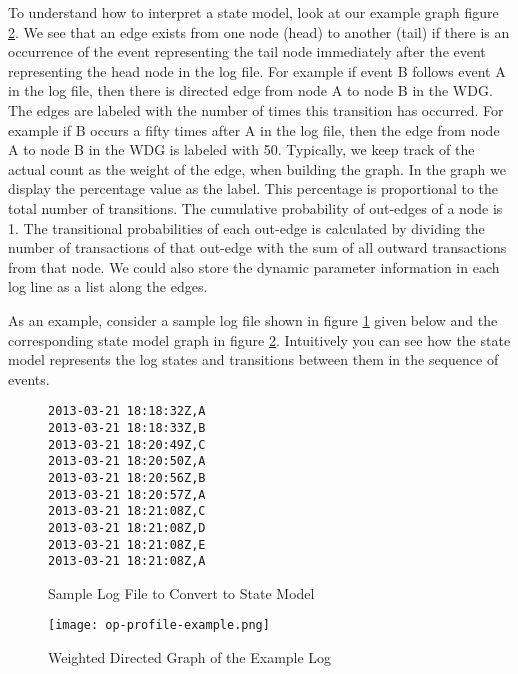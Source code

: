 To understand how to interpret a state model, look at our example graph figure \ref{op-profile-example}.  We see that an edge exists from one node (head) to another (tail) if there is an occurrence of the event representing the tail node immediately after the event representing the head node in the  log file. For example if event B follows event A in the log file, then there is directed edge from node A to node B in the WDG. The edges are labeled with the number of times this transition has occurred.  For example if B occurs a fifty times after A in the log file, then the edge from node A to node B in the WDG is labeled with 50. Typically, we keep track of the actual count as the weight of the edge, when building the graph. In the graph we display the percentage value as the label. This percentage is proportional to the total number of transitions.  The cumulative probability of out-edges of a node is 1. The transitional probabilities of each out-edge is calculated by dividing the number of transactions of that out-edge with the sum of all outward transactions from that node. We could also store the dynamic parameter information in each log line as a list along the edges. 

As an example, consider a sample log file shown in figure \ref{samplelogfile} given below and the corresponding state model graph in figure \ref{op-profile-example}. Intuitively you can see how the state model represents the log states and transitions between them in the sequence of events.  

\begin{figure}
\hrulefill
\begin{verbatim}
2013-03-21 18:18:32Z,A
2013-03-21 18:18:33Z,B
2013-03-21 18:20:49Z,C
2013-03-21 18:20:50Z,A
2013-03-21 18:20:56Z,B
2013-03-21 18:20:57Z,A
2013-03-21 18:21:08Z,C
2013-03-21 18:21:08Z,D
2013-03-21 18:21:08Z,E
2013-03-21 18:21:08Z,A
\end{verbatim}
\hrulefill
\caption{Sample Log File to Convert to State Model}\label{samplelogfile}
\end{figure}

\begin{figure}[h]
  \centering
  \texttt{[image: op-profile-example.png]}
  \caption{Weighted Directed Graph of the Example Log}\label{op-profile-example}
\end{figure}






 
